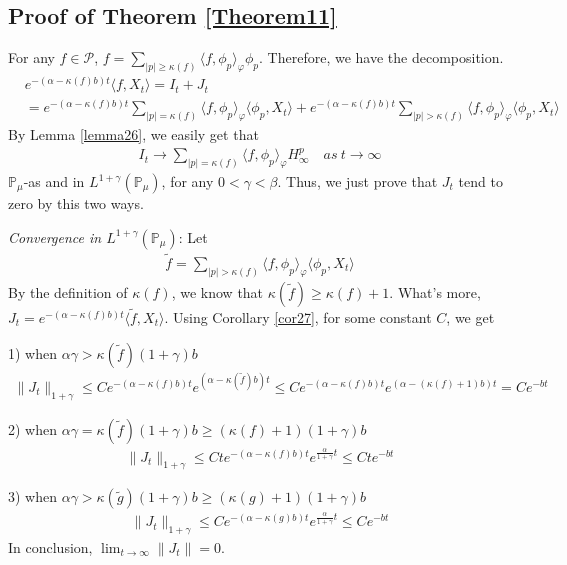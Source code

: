 \documentclass[12pt,oneside,english]{amsart}
\theoremstyle{plain}
\theoremstyle{definition}
\numberwithin{equation}{section}
\begin{document}
\subsection{Proof of Theorem \ref{Theorem11}}
For any $f\in \mathcal{P}$, $f=\sum_{|p|\geq \kappa(f)}\langle f,\phi_p\rangle_\varphi \phi_p$. Therefore, we have the decomposition.
\begin{align*}
    &e^{-(\alpha-\kappa(f)b)t}\langle f,X_t\rangle=I_t+J_t\\
    &=e^{-(\alpha-\kappa(f)b)t}\sum_{|p|= \kappa(f)}\langle f,\phi_p\rangle_\varphi \langle \phi_p,X_t\rangle+e^{-(\alpha-\kappa(f)b)t}\sum_{|p|> \kappa(f)}\langle f,\phi_p\rangle_\varphi \langle \phi_p,X_t\rangle
\end{align*}
By Lemma \ref{lemma26}, we easily get that
\begin{align*}
    I_t \rightarrow \sum_{|p|=\kappa(f)}\langle f, \phi_p\rangle_{\varphi} H_{\infty}^p  \quad as~ t\rightarrow \infty
\end{align*}
$\mathbb{P}_{\mu}$-as and in $L^{1+\gamma}(\mathbb{P}_{\mu})$, for any $0< \gamma<\beta$. Thus, we just prove that $J_t$ tend to zero by this two ways.

{\em Convergence in $L^{1+\gamma}(\mathbb{P}_{\mu})$}:
Let
\begin{align*}
    \tilde{f}=\sum_{|p|> \kappa(f)}\langle f,\phi_p\rangle_\varphi \langle \phi_p,X_t\rangle
\end{align*}
By the definition of $\kappa(f)$, we know that $\kappa(\tilde{f})\geq \kappa(f)+1$. What's more, $J_t=e^{-(\alpha-\kappa(f)b)t}\langle \tilde{f},X_t\rangle$.
Using Corollary \ref{cor27}, for some constant $C$, we get

1) when $\alpha\gamma>\kappa(\tilde{f})(1+\gamma)b$
\begin{align*}
    \|J_t\|_{1+\gamma}\leq C e^{-(\alpha-\kappa(f)b)t}e^{(\alpha-\kappa(\tilde{f})b)t}\leq C  e^{-(\alpha-\kappa(f)b)t}e^{(\alpha-(\kappa(f)+1)b)t}=C e^{-bt}
\end{align*}

2) when $\alpha\gamma=\kappa(\tilde{f})(1+\gamma)b\geq (\kappa(f)+1)(1+\gamma)b$
\begin{align*}
     \|J_t\|_{1+\gamma}\leq C t e^{-(\alpha-\kappa(f)b)t}e^{\frac{\alpha}{1+\gamma}t}\leq C t e^{-bt}
\end{align*}

3) when $\alpha\gamma>\kappa(\tilde{g})(1+\gamma)b\geq (\kappa(g)+1)(1+\gamma)b$
\begin{align*}
    \|J_t\|_{1+\gamma}\leq C e^{-(\alpha-\kappa(g)b)t}e^{\frac{\alpha}{1+\gamma}t}\leq C e^{-bt}
\end{align*}
In conclusion, $\lim_{t\rightarrow \infty}\|J_t\|=0$.
\end{document}
